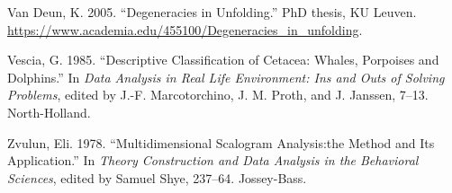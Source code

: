 \documentclass[
  12pt,
  letterpaper,
  DIV=11,
  numbers=noendperiod]{scrartcl}
\newlength{\cslhangindent}
\newenvironment{CSLReferences}[2] %
 {\begin{list}{}{%
  \setlength{\itemindent}{0pt}
  \setlength{\leftmargin}{0pt}
  \setlength{\parsep}{0pt}
  \ifodd #1
   \setlength{\leftmargin}{\cslhangindent}
   \setlength{\itemindent}{-1\cslhangindent}
  \fi
  \setlength{\itemsep}{#2\baselineskip}}}
 {\end{list}}
\begin{document}
\begin{CSLReferences}{1}{0}
Van Deun, K. 2005. {``Degeneracies in Unfolding.''} PhD thesis, KU
Leuven. \url{https://www.academia.edu/455100/Degeneracies_in_unfolding}.

Vescia, G. 1985. {``Descriptive Classification of Cetacea: Whales,
Porpoises and Dolphins.''} In \emph{Data Analysis in Real Life
Environment: Ins and Outs of Solving Problems}, edited by J.-F.
Marcotorchino, J. M. Proth, and J. Janssen, 7--13. North-Holland.

Zvulun, Eli. 1978. {``Multidimensional Scalogram Analysis:the Method and
Its Application.''} In \emph{Theory Construction and Data Analysis in
the Behavioral Sciences}, edited by Samuel Shye, 237--64. Jossey-Bass.

\end{CSLReferences}
\end{document}
